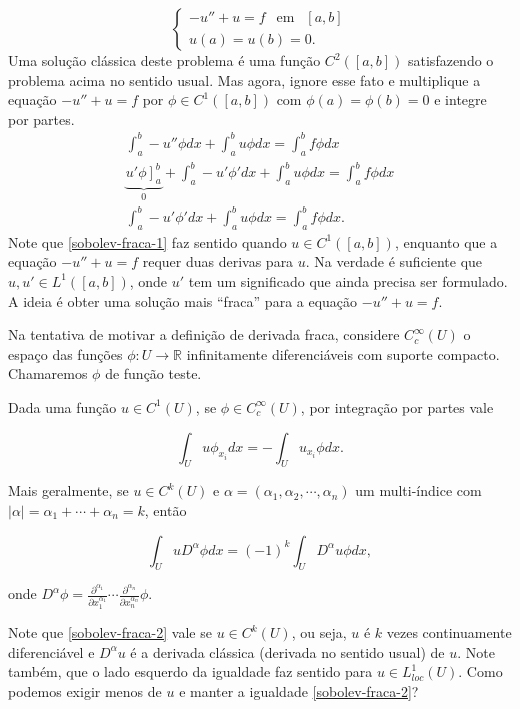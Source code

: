 \documentclass[11pt]{article}
\begin{document}
\[ \begin{cases}
-u'' +u =f \ \ \mbox{ em } \ \ [a,b] \\
	u(a)=u(b)=0.
\end{cases} \]
Uma solução clássica deste problema é uma função $C^2([a,b])$ satisfazendo o problema acima no sentido usual. Mas agora, ignore esse fato e multiplique a equação $-u'' +u =f $ por $\phi \in C^1([a,b])$ com $\phi(a)=\phi(b)=0$ e integre por partes.
\begin{align}\label{sobolev-fraca-1}
\int_a^b -u'' \phi dx +  \int_a^b u \phi dx =  \int_a^b f \phi dx\nonumber \\
\underbrace{\left. u' \phi \right]_a^b}_{0} + \int_a^b -u' \phi' dx +  \int_a^b u \phi dx =  \int_a^b f \phi dx \nonumber\\
\int_a^b -u' \phi' dx +  \int_a^b u \phi dx =  \int_a^b f \phi dx .
\end{align}
Note que \eqref{sobolev-fraca-1} faz sentido quando $u \in C^1([a,b])$, enquanto que a equação  $-u'' +u =f $ requer duas derivas para $u$. Na verdade é suficiente que $u, u' \in L^1([a,b])$, onde $u'$ tem um significado que ainda precisa ser formulado. A ideia é obter uma solução mais ``fraca'' para a equação $-u'' +u =f $.

Na tentativa de motivar a definição de derivada fraca, considere $C^{\infty}_c (U)$ o espaço das funções $ \phi :U \longrightarrow \mathbb{R}$ infinitamente diferenciáveis com suporte compacto. Chamaremos $\phi$ de função teste.

Dada uma função $u \in C^1(U)$, se $\phi \in C^{\infty}_c (U)$, por integração por partes vale

\begin{equation}
	\int_{U} u \phi_{x_i} dx = - \int_{U} u_{x_i} \phi dx.
\end{equation}

Mais geralmente, se $u \in C^k(U)$ e $\alpha=(\alpha_1, \alpha_2, \cdots, \alpha_n)$ um multi-índice com $|\alpha|= \alpha_1 + \cdots +\alpha_n= k$, então

\begin{equation}\label{sobolev-fraca-2}
\int_{U} u D^{\alpha}\phi dx = (-1)^k \int_{U} D^{\alpha}u \phi dx,
\end{equation}

onde $D^{\alpha} \phi= \frac{\partial ^{\alpha_1}}{\partial x_1^{\alpha_1}}\cdots \frac{\partial ^{\alpha_n}}{\partial x_n^{\alpha_n}}\phi$.

Note que \eqref{sobolev-fraca-2} vale se $u \in C^k(U)$, ou seja, $u$ é $k$ vezes continuamente diferenciável e $D^{\alpha}u$ é a derivada clássica (derivada no sentido usual) de $u$. Note também, que o lado esquerdo  da igualdade faz sentido para $u \in L^1_{loc}(U)$. Como podemos exigir menos de $u$ e manter a igualdade \eqref{sobolev-fraca-2}?
\end{document}
